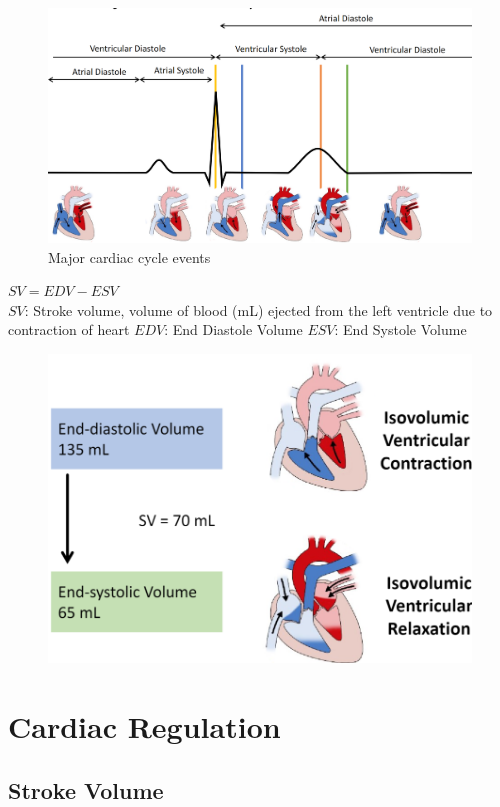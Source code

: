 \documentclass[11pt,fleqn]{book}
\begin{document}
\begin{figure}[h!]
\begin{center}
    \includegraphics[width=0.65\linewidth]{Pictures/Screenshot 2024-04-04 001715.png}
    \caption{Major cardiac cycle events}
\end{center}
\end{figure}

\begin{theorem}
    $SV=EDV-ESV$\\
    $SV$: Stroke volume,  volume of blood (mL)
ejected from the left ventricle
due to contraction of heart
    $EDV$: End Diastole Volume
    $ESV$: End Systole Volume
\end{theorem}

\begin{figure}[h!]
\begin{center}
    \includegraphics[width=0.6\linewidth]{Pictures/Screenshot 2024-04-04 001818.png}
    \caption{}
\end{center}
\end{figure}

\newpage
\section{Cardiac Regulation}
\subsection{Stroke Volume}
\end{document}
